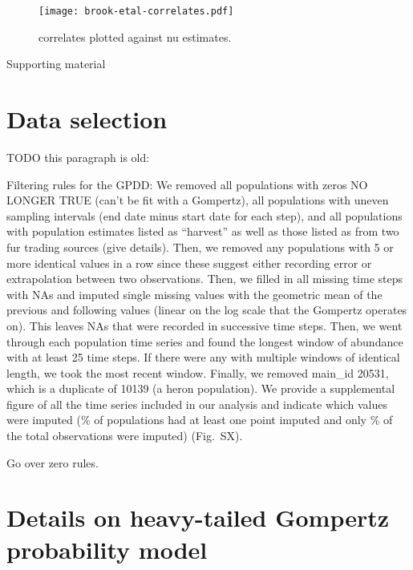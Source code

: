 \documentclass[11pt]{article}
\begin{document}
\clearpage

\begin{figure}[htbp]
\begin{center}
\texttt{[image: brook-etal-correlates.pdf]}
\caption{
  \citet{brook2006a} correlates plotted against nu estimates.
}
\label{fig:brook}
\end{center}
\end{figure}

\clearpage

\begin{centering}
\LARGE
Supporting material\\[1.5em]
\end{centering}

\section{Data selection}

TODO this paragraph is old:

Filtering rules for the GPDD:
We removed all populations with zeros NO LONGER TRUE (can't be fit with a Gompertz), all populations with uneven sampling intervals (end date minus start date for each step), and all populations with population estimates listed as ``harvest'' as well as those listed as from two fur trading sources (give details).
Then, we removed any populations with 5 or more identical values in a row since these suggest either recording error or extrapolation between two observations.
Then, we filled in all missing time steps with NAs and imputed single missing values with the geometric mean of the previous and following values (linear on the log scale that the Gompertz operates on). This leaves NAs that were recorded in successive time steps.
Then, we went through each population time series and found the longest window of abundance with at least 25 time steps. If there were any with multiple windows of identical length, we took the most recent window.
Finally, we removed main\_id 20531, which is a duplicate of 10139 (a heron population). We provide a supplemental figure of all the time series included in our analysis and indicate which values were imputed (\percImputedPops\% of populations had at least one point imputed and only \percImputedPoints\% of the total observations were imputed) (Fig.\ SX).

Go over zero rules.

\section{Details on heavy-tailed Gompertz probability model}
\end{document}

